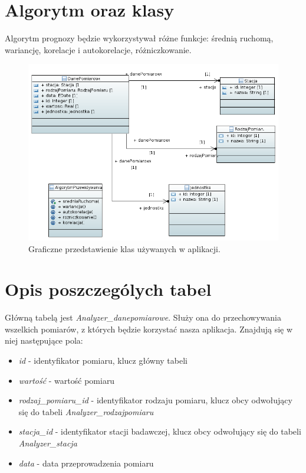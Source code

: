 \documentclass[11pt, a4paper, oneside]{mwart}
\begin{document}
\section{Algorytm oraz klasy }

Algorytm prognozy będzie wykorzystywał różne funkcje: średnią ruchomą, wariancję, korelacje i autokorelacje, różniczkowanie.

\begin{figure}[htbp]
  \centering
  \includegraphics[width=\textwidth]{./uml}
  \caption{Graficzne przedstawienie klas używanych w aplikacji.}
  \label{fig:diagram_uml}
\end{figure}


\section{Opis poszczególych tabel}
Główną tabelą jest \textit{Analyzer\_danepomiarowe}. Służy ona do przechowywania wszelkich pomiarów, z których będzie korzystać nasza aplikacja. Znajdują się w niej następujące pola:
\begin{itemize}
	\item \textit{id} - identyfikator pomiaru, klucz główny tabeli
	\item \textit{wartość} - wartość pomiaru
	\item \textit{rodzaj\_pomiaru\_id} - identyfikator rodzaju pomiaru, klucz obcy odwołujący się do tabeli \textit{Analyzer\_rodzajpomiaru}
	\item \textit{stacja\_id} - identyfikator stacji badawczej, klucz obcy odwołujący się do tabeli \textit{Analyzer\_stacja}
	\item \textit{data} - data przeprowadzenia pomiaru
\end{itemize}
\end{document}
